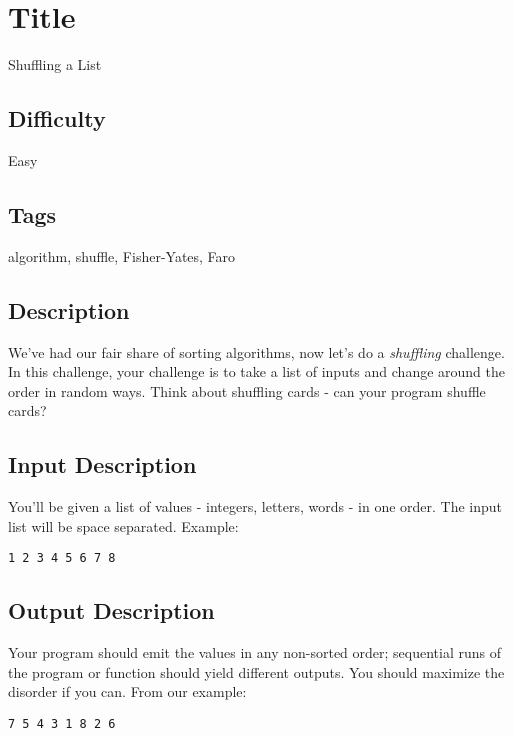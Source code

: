 \section{Title}\label{title-8}

Shuffling a List

\subsection{Difficulty}\label{difficulty-8}

Easy

\subsection{Tags}\label{tags-8}

algorithm, shuffle, Fisher-Yates, Faro

\subsection{Description}\label{description-8}

We've had our fair share of sorting algorithms, now let's do a
\emph{shuffling} challenge. In this challenge, your challenge is to take
a list of inputs and change around the order in random ways. Think about
shuffling cards - can your program shuffle cards?

\subsection{Input Description}\label{input-description-7}

You'll be given a list of values - integers, letters, words - in one
order. The input list will be space separated. Example:

\begin{verbatim}
1 2 3 4 5 6 7 8 
\end{verbatim}

\subsection{Output Description}\label{output-description-7}

Your program should emit the values in any non-sorted order; sequential
runs of the program or function should yield different outputs. You
should maximize the disorder if you can. From our example:

\begin{verbatim}
7 5 4 3 1 8 2 6
\end{verbatim}

